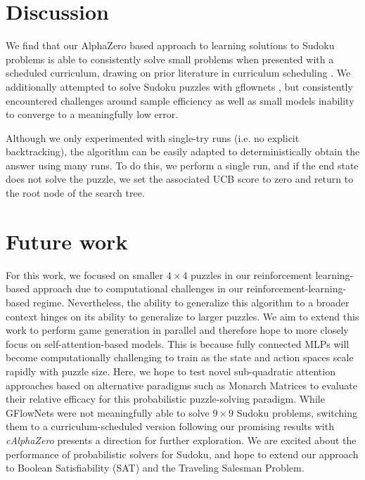\documentclass[10pt, reqno, letterpaper, twoside]{amsart}
\begin{document}
\section{Discussion}

We find that our AlphaZero \cite{Silver2018} based approach to learning solutions to Sudoku problems is able to consistently solve small problems when presented with a scheduled curriculum, drawing on prior literature in curriculum scheduling \cite{https://doi.org/10.15488/13422}.  We additionally attempted to solve Sudoku puzzles with gflownets \cite{bengio2023gflownet}, but consistently encountered challenges around sample efficiency as well as small models inability to converge to a meaningfully low error.  

Although we only experimented with single-try runs (i.e. no explicit backtracking), the algorithm can be easily adapted to deterministically obtain the answer using many runs. To do this, we perform a single run, and if the end state does not solve the puzzle, we set the associated UCB score to zero and return to the root node of the search tree.

\section{Future work}

For this work, we focused on smaller $4\times 4$ puzzles in our reinforcement learning-based approach due to computational challenges in our reinforcement-learning-based regime. Nevertheless, the ability to generalize this algorithm to a broader context hinges on its ability to generalize to larger puzzles. We aim to extend this work to perform game generation in parallel and therefore hope to more closely focus on self-attention-based models. This is because fully connected MLPs will become computationally challenging to train as the state and action spaces scale rapidly with puzzle size. Here, we hope to test novel sub-quadratic attention approaches based on alternative paradigms such as Monarch Matrices \cite{fu2023monarch} to evaluate their relative efficacy for this probabilistic puzzle-solving paradigm. While GFlowNets were not meaningfully able to solve $9\times 9$ Sudoku problems, switching them to a curriculum-scheduled version following our promising results with \textit{cAlphaZero} presents a direction for further exploration. We are excited about the performance of probabilistic solvers for Sudoku, and hope to extend our approach to Boolean Satisfiability (SAT) and the Traveling Salesman Problem. 
\end{document}
